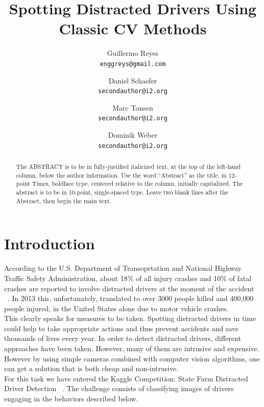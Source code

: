 \documentclass[10pt,twocolumn,letterpaper]{article}
\begin{document}
\title{Spotting Distracted Drivers Using Classic CV Methods}

\author{Guillermo Reyes\\
{\tt\small enggreys@gmail.com}
\and
Daniel Schaefer\\
{\tt\small secondauthor@i2.org}
\and
Marc Tonsen\\
{\tt\small secondauthor@i2.org}
\and
Dominik Weber\\
{\tt\small secondauthor@i2.org}
}

\maketitle

\begin{abstract}
   The ABSTRACT is to be in fully-justified italicized text, at the top
   of the left-hand column, below the author 
   information. Use the word ``Abstract'' as the title, in 12-point
   Times, boldface type, centered relative to the column, initially
   capitalized. The abstract is to be in 10-point, single-spaced type.
   Leave two blank lines after the Abstract, then begin the main text.
\end{abstract}


\section{Introduction}
According to the U.S. Department of Transoprtation and National Highway Traffic Safety Administration, about 18\% of all injury crashes and 10\% of fatal crashes are reported to involve distracted drivers at the moment of the accident ~\cite{knuthwebsite}. In 2013 this, unfortunately, translated to over 3000 people killed and 400,000 people injured, in the United States alone due to motor vehicle crashes.\\
This clearly speaks for measures to be taken. Spotting distracted drivers in time could help to take appropriate actions and thus prevent accidents and save thousands of lives every year. In order to detect distracted drivers, different approaches have been taken. However, many of them are intrusive and expensive. However by using simple cameras combined with computer vision algorithms, one can get a solution that is both cheap and non-intrusive.\\
For this task we have entered the Kaggle Competition: State Farm Distracted Driver Detection ~\cite{Kaggle}. The challenge consists of classifying images of drivers engaging in the behaviors described below.
\end{document}
